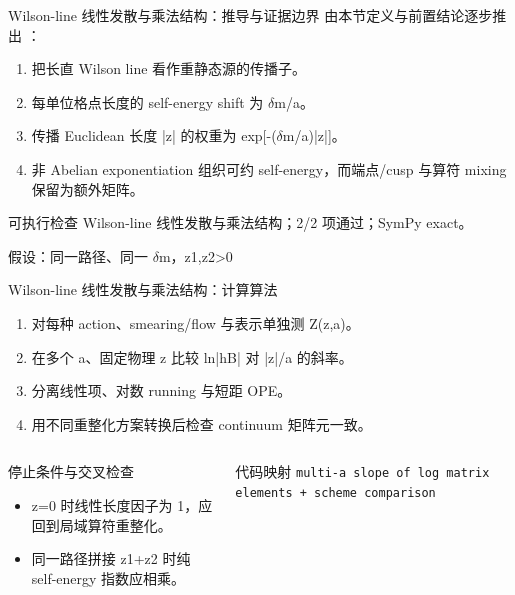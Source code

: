 \begin{frame}[t]{Wilson-line 线性发散与乘法结构：推导与证据边界}
\footnotesize
{}\quad 由本节定义与前置结论逐步推出 ：
\begin{enumerate}
\item 把长直 Wilson line 看作重静态源的传播子。
\item 每单位格点长度的 self-energy shift 为 \ensuremath{\delta}m/\allowbreak{}a。
\item 传播 Euclidean 长度 |z| 的权重为 exp[-(\ensuremath{\delta}m/\allowbreak{}a)|z|]。
\item 非 Abelian exponentiation 组织可约 self-energy，而端点/\allowbreak{}cusp 与算符 mixing 保留为额外矩阵。
\end{enumerate}\begin{block}{可执行检查}
\quad Wilson-line 线性发散与乘法结构；2/2 项通过；SymPy exact。
\par\scriptsize 假设：同一路径、同一 \ensuremath{\delta}m，z1,z2>0
\end{block}
\end{frame}

\begin{frame}[t]{Wilson-line 线性发散与乘法结构：计算算法}
\footnotesize
{}\begin{enumerate}
\item 对每种 action、smearing/\allowbreak{}flow 与表示单独测 Z(z,a)。
\item 在多个 a、固定物理 z 比较 ln|hB| 对 |z|/\allowbreak{}a 的斜率。
\item 分离线性项、对数 running 与短距 OPE。
\item 用不同重整化方案转换后检查 continuum 矩阵元一致。
\end{enumerate}\begin{columns}[T,onlytextwidth]
\begin{block}{停止条件与交叉检查}\scriptsize\begin{itemize}
\item[\CheckMark] z=0 时线性长度因子为 1，应回到局域算符重整化。
\item[\CheckMark] 同一路径拼接 z1+z2 时纯 self-energy 指数应相乘。
\end{itemize}\end{block}
\begin{block}{代码映射}
\scriptsize \texttt{multi-a slope of log matrix elements + scheme comparison}
\end{block}\end{columns}\end{frame}

